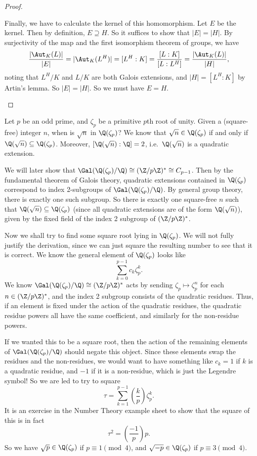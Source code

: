 \documentclass[a4paper]{article}
\begin{document}
\begin{proof}
\begin{enumerate}
      Finally, we have to calculate the kernel of this homomorphism. Let $E$ be the kernel. Then by definition, $E\supseteq H$. So it suffices to show that $|E| = |H|$. By surjectivity of the map and the first isomorphism theorem of groups, we have
      \[
        \frac{|\Aut_K(L)|}{|E|} = |\Aut_K(L^H)| = [L^H:K] = \frac{[L:K]}{[L:L^H]} = \frac{|\Aut_K(L)|}{|H|},
      \]
      noting that $L^H/K$ and $L/K$ are both Galois extensions, and $|H| = [L^H:K]$ by Artin's lemma. So $|E| = |H|$. So we must have $E = H$.
  \end{enumerate}
\end{proof}

\begin{eg}
  Let $p$ be an odd prime, and $\zeta_p$ be a primitive $p$th root of unity. Given a (square-free) integer $n$, when is $\sqrt{n}$ in $\Q(\zeta_p)$? We know that $\sqrt{n} \in \Q(\zeta_p)$ if and only if $\Q(\sqrt{n}) \subseteq \Q(\zeta_p)$. Moreover, $[\Q(\sqrt{n}):\Q] = 2$, i.e.\ $\Q(\sqrt{n})$ is a quadratic extension.

  We will later show that $\Gal(\Q(\zeta_p)/\Q) \cong (\Z/p\Z)^* \cong C_{p - 1}$. Then by the fundamental theorem of Galois theory, quadratic extensions contained in $\Q(\zeta_p)$ correspond to index 2-subgroups of $\Gal(\Q(\zeta_p)/\Q)$. By general group theory, there is exactly one such subgroup. So there is exactly one square-free $n$ such that $\Q(\sqrt{n}) \subseteq \Q(\zeta_p)$ (since all quadratic extensions are of the form $\Q(\sqrt{n})$), given by the fixed field of the index 2 subgroup of $(\Z/p\Z)^*$.

  Now we shall try to find some square root lying in $\Q(\zeta_p)$. We will not fully justify the derivation, since we can just square the resulting number to see that it is correct. We know the general element of $\Q(\zeta_p)$ looks like
  \[
    \sum_{k = 0}^{p - 1} c_k \zeta_p^k.
  \]
  We know $\Gal(\Q(\zeta_p)/\Q)\cong (\Z/p\Z)^*$ acts by sending $\zeta_p \mapsto \zeta_p^n$ for each $n \in (\Z/p\Z)^*$, and the index 2 subgroup consists of the quadratic residues. Thus, if an element is fixed under the action of the quadratic residues, the quadratic residue powers all have the same coefficient, and similarly for the non-residue powers.

  If we wanted this to be a square root, then the action of the remaining elements of $\Gal(\Q(\zeta_p)/\Q)$ should negate this object. Since these elements swap the residues and the non-residues, we would want to have something like $c_k = 1$ if $k$ is a quadratic residue, and $-1$ if it is a non-residue, which is just the Legendre symbol! So we are led to try to square
  \[
    \tau = \sum_{k = 1}^{p - 1} \left(\frac{k}{p}\right) \zeta_p^k.
  \]
  It is an exercise in the Number Theory example sheet to show that the square of this is in fact
  \[
    \tau^2 = \left(\frac{-1}{p}\right) p.
  \]
  So we have $\sqrt{p} \in \Q(\zeta_p)$ if $p \equiv 1 \pmod 4$, and $\sqrt{-p} \in \Q(\zeta_p)$ if $p \equiv 3 \pmod 4$.
\end{eg}
\end{document}

